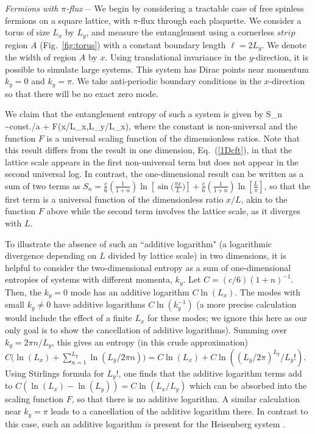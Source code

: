 \documentclass[prl,aps,twocolumn,floatfix,amsmath,amssymb,superscriptaddress,tightenlines]{revtex4}
\begin{document}
{\it Fermions with $\pi$-flux---}
We begin by considering a tractable case of
free spinless fermions on a square lattice, with $\pi$-flux through each plaquette.  We consider a torus of size $L_x$ by $L_y$, and
measure the entanglement %
using a cornerless $strip$ region $A$ (Fig.~\ref{fig:torus}) with a constant boundary length $\ell = 2L_y$.
We denote the width of region $A$ by $x$. %
Using translational invariance in the $y$-direction, it is possible to simulate large systems.  This system has Dirac points near momentum $k_y=0$ and $k_y=\pi$.  We take anti-periodic boundary conditions in the $x$-direction so that there will be no exact zero mode.

We claim that the entanglement entropy of such a system is given by
\be
S_n \sim {\rm const.}\times \ell /a + F(x/L_x,L_y/L_x),
\ee
where the constant is non-universal and the function $F$ is a universal scaling function of the dimensionless ratios.  Note that this result differs
from the result in one dimension, Eq.~(\ref{1Dcft}), in that the lattice scale appears in the first non-universal term but does not appear in the second universal log.  In contrast, the one-dimensional result can be written as a sum of two terms as
$S_n = \frac{c}{6}\left({ \frac{1}{1+n} }\right) \ln[\sin\big( \frac{\pi x}{L} \big)]+\frac{c}{6}\left(\frac{1}{1+n}\right)\ln[\frac{L}{\pi}]$, so that the first term is a universal function of the dimensionless ratio $x/L$, akin to the function $F$ above while the second term involves the lattice scale, as it diverges with $L$.

To illustrate the absence of such an ``additive logarithm" (a logarithmic divergence depending on $L$ divided by lattice scale) in two dimensions, it is helpful to 
consider the two-dimensional entropy as a sum of one-dimensional entropies of systems with different momenta, $k_y$.  Let $C=(c/6)(1+n)^{-1}$.  Then, the $k_y=0$ mode has an additive logarithm $C \ln(L_x)$.  The modes with small $k_y \neq 0$ have additive logarithms $C \ln(k_y^{-1})$ (a more precise calculation would include the effect of a finite $L_x$ for these modes; we ignore this here as our only goal is to show the cancellation of additive logarithms).  Summing over $k_y=2\pi n/L_y$, this gives an entropy (in this crude approximation) $C \big( \ln(L_x)+\sum_{n=1}^{L_y} \ln(L_y/2 \pi n) \big)=C\ln(L_x) + C\ln((L_y/2\pi)^{L_y}/L_y!)$.  Using Stirlings formula for $L_y!$, one finds that the additive logarithm terms add to $C(\ln(L_x)-\ln(L_y))=C\ln(L_x/L_y)$ which can be absorbed into the scaling function $F$, so that there is no additive logarithm.  A similar calculation near $k_y=\pi$ leads to a cancellation of the additive logarithm there.
In contrast to this case, such an additive logarithm {\it is} present for the Heisenberg system \cite{HeisLog,MaxLog}.
\end{document}
